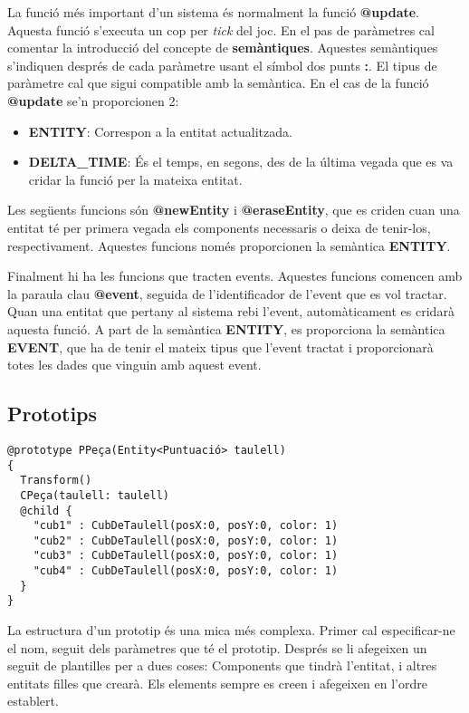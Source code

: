 La funció més important d'un sistema és normalment la funció {\bf @update}. Aquesta funció s'executa un cop per {\em tick} del joc. En el pas de paràmetres cal comentar la introducció del concepte de {\bf semàntiques}. Aquestes semàntiques s'indiquen després de cada paràmetre usant el símbol dos punts {\bf :}. El tipus de paràmetre cal que sigui compatible amb la semàntica. En el cas de la funció {\bf @update} se'n proporcionen 2:

\begin{itemize}
  \item {\bf ENTITY}: Correspon a la entitat actualitzada.
  \item {\bf DELTA\_TIME}: És el temps, en segons, des de la última vegada que es va cridar la funció per la mateixa entitat.
\end{itemize}

Les següents funcions són {\bf @newEntity} i {\bf @eraseEntity}, que es criden cuan una entitat té per primera vegada els components necessaris o deixa de tenir-los, respectivament. Aquestes funcions només proporcionen la semàntica {\bf ENTITY}.

Finalment hi ha les funcions que tracten events. Aquestes funcions comencen amb la paraula clau {\bf @event}, seguida de l'identificador de l'event que es vol tractar. Quan una entitat que pertany al sistema rebi l'event, automàticament es cridarà aquesta funció. A part de la semàntica {\bf ENTITY}, es proporciona la semàntica {\bf EVENT}, que ha de tenir el mateix tipus que l'event tractat i proporcionarà totes les dades que vinguin amb aquest event.

\subsection{Prototips}

\begin{verbatim}
@prototype PPeça(Entity<Puntuació> taulell)
{
  Transform()
  CPeça(taulell: taulell)
  @child {
    "cub1" : CubDeTaulell(posX:0, posY:0, color: 1)
    "cub2" : CubDeTaulell(posX:0, posY:0, color: 1)
    "cub3" : CubDeTaulell(posX:0, posY:0, color: 1)
    "cub4" : CubDeTaulell(posX:0, posY:0, color: 1)
  }
}
\end{verbatim}

La estructura d'un prototip és una mica més complexa. Primer cal especificar-ne el nom, seguit dels paràmetres que té el prototip. Després se li afegeixen un seguit de plantilles per a dues coses: Components que tindrà l'entitat, i altres entitats filles que crearà. Els elements sempre es creen i afegeixen en l'ordre establert.


